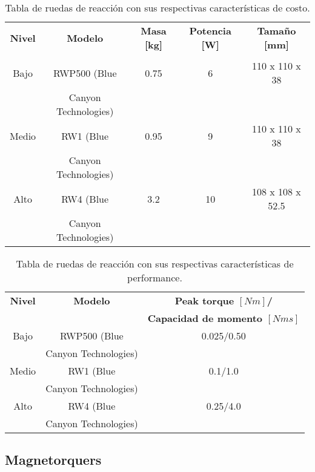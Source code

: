 \begin{table}[H]
	\centering
	\caption{Tabla de ruedas de reacción con sus respectivas características de costo.}
	\begin{tabular}{|c|c|c|c|c|}
		\hline
		\textbf{Nivel} & \textbf{Modelo} & \textbf{Masa [kg]} & \textbf{Potencia [W]} & \textbf{Tamaño [mm]}  \\
		& &  &  &   \\ \hline
		Bajo & RWP500 (Blue  & 0.75 & 6 & 110 x 110 x 38 \\
		&  Canyon Technologies) &  &  &  \\ \hline
		Medio & RW1 (Blue & 0.95 & 9 &  110 x 110 x 38   \\
		& Canyon Technologies) & &  &  \\ \hline
		Alto & RW4 (Blue & 3.2 & 10 & 108 x 108 x 52.5  \\
		& Canyon Technologies) & &  &   \\ \hline
	\end{tabular}
	
\end{table}

\begin{table}[H]
	\centering
	\caption{Tabla de ruedas de reacción con sus respectivas características de performance.}
	\begin{tabular}{|c|c|c|}
		\hline
		\textbf{Nivel} & \textbf{Modelo} & \textbf{Peak torque $[Nm]$/}  \\
		& & \textbf{Capacidad de momento $[Nms]$}   \\ \hline
		Bajo & RWP500 (Blue & 0.025/0.50  \\
		& Canyon Technologies) &   \\ \hline
		Medio & RW1 (Blue & 0.1/1.0  \\
		& Canyon Technologies) &   \\ \hline
		Alto & RW4 (Blue & 0.25/4.0   \\
		& Canyon Technologies) &    \\ \hline
	\end{tabular}
	
\end{table}

\subsection{Magnetorquers}


